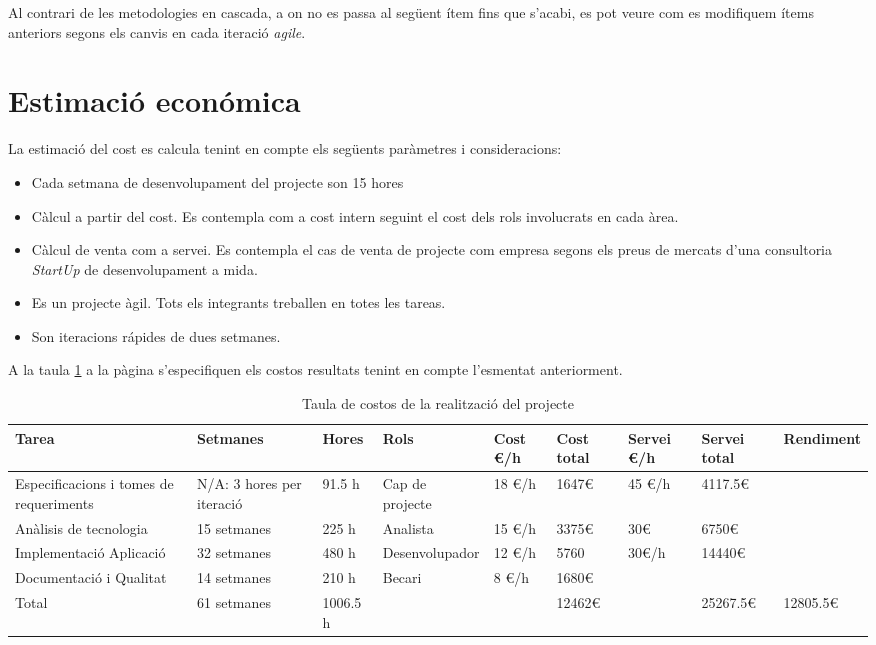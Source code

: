 Al contrari de les metodologies en cascada, a on no es passa al següent ítem fins que s'acabi, es pot veure com es modifiquem ítems anteriors segons els canvis en cada iteració \textit{agile}.

\section{Estimaci\'{o} econ\'{o}mica}
La estimació del cost es calcula tenint en compte els següents paràmetres i consideracions:
\begin{itemize}
\item Cada setmana de desenvolupament del projecte son 15 hores
\item C\`{a}lcul a partir del cost. Es contempla com a cost intern seguint el cost dels rols involucrats en cada àrea.
\item C\`{a}lcul de venta com a servei. Es contempla el cas de venta de projecte com empresa segons els preus de mercats d'una consultoria \textit{StartUp} de desenvolupament a mida.
\item Es un projecte àgil. Tots els integrants treballen en totes les tareas.
\item Son iteracions r\'{a}pides de dues setmanes.
\end{itemize}

A la taula \ref{costs} a la p\`{a}gina \pageref{costs} s'especifiquen els costos resultats tenint en compte l'esmentat anteriorment.

\begin{table}
\begin{tabular}{|p{2.75cm}|p{2cm}|p{1cm}|p{3cm}|p{1cm}|p{2cm}|p{2cm}|p{2cm}|p{1.75cm}|}
\hline
Tarea & Setmanes & Hores & Rols & Cost \euro/h & Cost total & Servei \euro/h & Servei total & Rendiment \\ \hline
Especificacions i tomes de requeriments & N/A: 3 hores per iteració & 91.5 h & Cap de projecte & 18 \euro/h & 1647\euro & 45 \euro/h & 4117.5\euro & \\ \hline
Anàlisis de tecnologia & 15 setmanes & 225 h & Analista & 15 \euro/h & 3375\euro & 30\euro & 6750\euro & \\ \hline
Implementació Aplicació & 32 setmanes & 480 h & Desenvolupador & 12 \euro/h & 5760 & 30\euro/h & 14440\euro & \\ \hline
Documentació i Qualitat & 14 setmanes & 210 h & Becari & 8 \euro/h & 1680\euro & & & \\ \hline 
\hline
Total & 61 setmanes & 1006.5 h & & & 12462\euro & & 25267.5\euro & 12805.5\euro \\ \hline
\end{tabular}
\caption{Taula de costos de la realització del projecte}
\label{costs}
\end{table}


